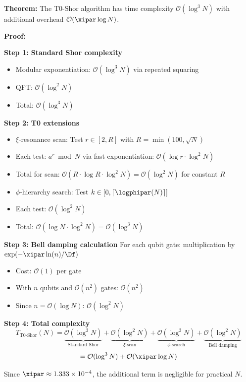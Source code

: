 \textbf{Theorem:} The T0-Shor algorithm has time complexity $\mathcal{O}(\log^3 N)$ with additional overhead $\mathcal{O}(\xipar \log N)$.

\textbf{Proof:}

\textbf{Step 1: Standard Shor complexity}
\begin{itemize}
	\item Modular exponentiation: $\mathcal{O}(\log^3 N)$ via repeated squaring
	\item QFT: $\mathcal{O}(\log^2 N)$
	\item Total: $\mathcal{O}(\log^3 N)$
\end{itemize}

\textbf{Step 2: T0 extensions}
\begin{itemize}
	\item $\xi$-resonance scan: Test $r \in [2, R]$ with $R = \min(100, \sqrt{N})$
	\item Each test: $a^r \bmod N$ via fast exponentiation: $\mathcal{O}(\log r \cdot \log^2 N)$
	\item Total for scan: $\mathcal{O}(R \cdot \log R \cdot \log^2 N) = \mathcal{O}(\log^2 N)$ for constant $R$
	\item $\phi$-hierarchy search: Test $k \in [0, \lceil \logphipar(N) \rceil]$
	\item Each test: $\mathcal{O}(\log^2 N)$
	\item Total: $\mathcal{O}(\log N \cdot \log^2 N) = \mathcal{O}(\log^3 N)$
\end{itemize}

\textbf{Step 3: Bell damping calculation}
For each qubit gate: multiplication by $\exp(-\xipar \ln(n)/\Df)$
\begin{itemize}
	\item Cost: $\mathcal{O}(1)$ per gate
	\item With $n$ qubits and $\mathcal{O}(n^2)$ gates: $\mathcal{O}(n^2)$
	\item Since $n = \mathcal{O}(\log N)$: $\mathcal{O}(\log^2 N)$
\end{itemize}

\textbf{Step 4: Total complexity}
\[
T_{\text{T0-Shor}}(N) = \underbrace{\mathcal{O}(\log^3 N)}_{\text{Standard Shor}} 
+ \underbrace{\mathcal{O}(\log^2 N)}_{\xi\text{-scan}} 
+ \underbrace{\mathcal{O}(\log^3 N)}_{\phi\text{-search}} 
+ \underbrace{\mathcal{O}(\log^2 N)}_{\text{Bell damping}}
\]
\[
= \mathcal{O}(\log^3 N) + \mathcal{O}(\xipar \log N)
\]

Since $\xipar \approx 1.333\times 10^{-4}$, the additional term is negligible for practical $N$.

